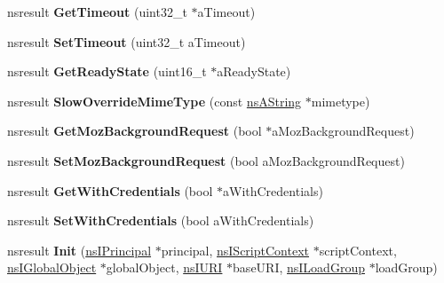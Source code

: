 \begin{DoxyCompactItemize}
nsresult {\bfseries Get\+Timeout} (uint32\+\_\+t $\ast$a\+Timeout)
\item 
\mbox{\label{interfacens_i_x_m_l_http_request_a65a064c5db99bddb7809c1d8485d6f0e}} 
nsresult {\bfseries Set\+Timeout} (uint32\+\_\+t a\+Timeout)
\item 
\mbox{\label{interfacens_i_x_m_l_http_request_a9b09d9659d55ab05a2a1a596d4b7c98d}} 
nsresult {\bfseries Get\+Ready\+State} (uint16\+\_\+t $\ast$a\+Ready\+State)
\item 
\mbox{\label{interfacens_i_x_m_l_http_request_a62d58165085b5c56bcb5a1d402fff12b}} 
nsresult {\bfseries Slow\+Override\+Mime\+Type} (const \hyperlink{structns_string_container}{ns\+A\+String} $\ast$mimetype)
\item 
\mbox{\label{interfacens_i_x_m_l_http_request_ab16519080a0db83046f993fe8d793b09}} 
nsresult {\bfseries Get\+Moz\+Background\+Request} (bool $\ast$a\+Moz\+Background\+Request)
\item 
\mbox{\label{interfacens_i_x_m_l_http_request_ad4137a6a3dc9aead2a97e1bede9113d1}} 
nsresult {\bfseries Set\+Moz\+Background\+Request} (bool a\+Moz\+Background\+Request)
\item 
\mbox{\label{interfacens_i_x_m_l_http_request_ac30c0d5c3797af1e7e87047931f6166c}} 
nsresult {\bfseries Get\+With\+Credentials} (bool $\ast$a\+With\+Credentials)
\item 
\mbox{\label{interfacens_i_x_m_l_http_request_a9f8b5921f642779cb6f89d987e3d0c9d}} 
nsresult {\bfseries Set\+With\+Credentials} (bool a\+With\+Credentials)
\item 
\mbox{\label{interfacens_i_x_m_l_http_request_a4267bb221a9c4d4946c0d77dddc490bb}} 
nsresult {\bfseries Init} (\hyperlink{interfacens_i_supports}{ns\+I\+Principal} $\ast$principal, \hyperlink{interfacens_i_supports}{ns\+I\+Script\+Context} $\ast$script\+Context, \hyperlink{interfacens_i_global_object}{ns\+I\+Global\+Object} $\ast$global\+Object, \hyperlink{interfacens_i_u_r_i}{ns\+I\+U\+RI} $\ast$base\+U\+RI, \hyperlink{interfacens_i_load_group}{ns\+I\+Load\+Group} $\ast$load\+Group)

\end{DoxyCompactItemize}

